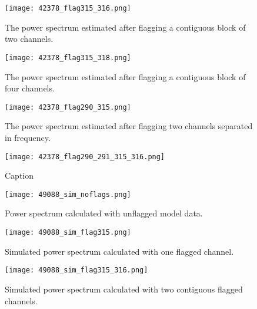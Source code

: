 \documentclass[12pt]{article}
\begin{document}
\begin{figure}[th]
	\centering
	\texttt{[image: 42378\_flag315\_316.png]}
	\caption[Power spectrum calculated with flagged time integrations and two contiguous flagged channels]{The power spectrum estimated after flagging a contiguous block of two channels.}
	\label{fig:flag_chan315_316}
\end{figure}

\begin{figure}[p]
	\centering
	\texttt{[image: 42378\_flag315\_318.png]}
	\caption[Power spectrum calculated with flagged time integrations and four contiguous flagged channels]{The power spectrum estimated after flagging a contiguous block of four channels.}
	\label{fig:flag_chan315_318}
\end{figure}

\begin{figure}[p]
	\centering
	\texttt{[image: 42378\_flag290\_315.png]}
	\caption[Power spectrum calculated with flagged time integrations and two non-contiguous flagged channels]{The power spectrum estimated after flagging two channels separated in frequency.}
	\label{fig:flag_chan290_315}
\end{figure}

\begin{figure}[p]
	\centering
	\texttt{[image: 42378\_flag290\_291\_315\_316.png]}
	\caption[Power spectrum calculated with flagged time integrations and four flagged channels (two blocks of two channels)]{Caption}
	\label{fig:flag_chan290_291_315_316}
\end{figure}

\begin{figure}[p]
	\centering
	\texttt{[image: 49088\_sim\_noflags.png]}
	\caption[Original model power spectrum (only foregrounds)]{Power spectrum calculated with unflagged model data.}
	\label{fig:sim_noflags}
\end{figure}

\begin{figure}[p]
	\centering
	\texttt{[image: 49088\_sim\_flag315.png]}
	\caption[Model power spectrum calculated with flagged time integrations and one flagged channel]{Simulated power spectrum calculated with one flagged channel.}
	\label{fig:sim_flag_chan315}
\end{figure}

\begin{figure}[p]
	\centering
	\texttt{[image: 49088\_sim\_flag315\_316.png]}
	\caption[Model power spectrum calculated with flagged time integrations and two contiguous flagged channels]{Simulated power spectrum calculated with two contiguous flagged channels.}
	\label{fig:sim_flag_chan315_316}
\end{figure}
\end{document}
